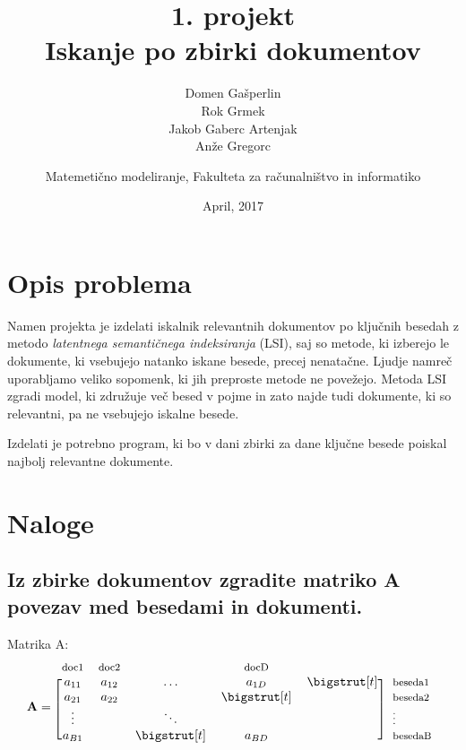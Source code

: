 \documentclass{article}
\begin{document}
\begin{titlepage}
\author{Domen Gašperlin\\Rok Grmek\\Jakob Gaberc Artenjak\\Anže Gregorc\and Matemetično modeliranje, Fakulteta za računalništvo in informatiko}
\title{\textbf{1. projekt\\Iskanje po zbirki dokumentov}}
\date{April, 2017}

\maketitle

\end{titlepage}

\section{Opis problema}
Namen projekta je izdelati iskalnik relevantnih dokumentov po ključnih besedah z metodo\textit{ latentnega semantičnega indeksiranja} (LSI), saj so metode, ki izberejo le dokumente, ki vsebujejo natanko iskane besede, precej nenatačne. Ljudje namreč uporabljamo veliko sopomenk, ki jih preproste metode ne povežejo. Metoda LSI zgradi model, ki združuje več besed v pojme in zato najde tudi dokumente, ki so relevantni, pa ne vsebujejo iskalne besede.

Izdelati je potrebno program, ki bo v dani zbirki za dane ključne besede poiskal najbolj relevantne dokumente.

\section{Naloge}
\subsection{Iz zbirke dokumentov zgradite matriko A povezav med besedami in dokumenti.}
\label{sec:matrikaA}

Matrika A:
\begin{equation*}
  \mathbf{A}=
  \begin{blockarray}{*{5}{c} l}
    \begin{block}{*{5}{>{$\footnotesize}c<{$}} l}
      doc1 & doc2 &  &  docD & \\
    \end{block}
    \begin{block}{[*{5}{c}]>{$\footnotesize}l<{$}}
      a_{11}  & a_{12} & \dots           & a_{1D}       & \bigstrut[t]& beseda1 \\
       a_{21} & a_{22} &                    & \bigstrut[t] &                   &   beseda2 \\
      \vdots   &             & \ddots         &                    &                   &   \vdots  \\
      a_{B1} &              &  \bigstrut[t] & a_{BD}       &                   &  besedaB \\
    \end{block}
  \end{blockarray}
\end{equation*}
\end{document}
